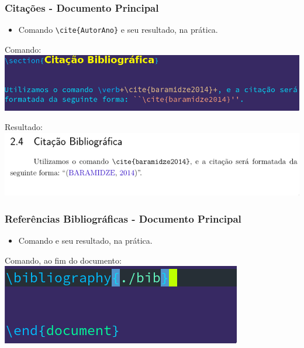 \documentclass{beamer}
\begin{document}
\begin{frame}[fragile]

  \frametitle{Citações - Documento Principal}

  \begin{itemize}
  \item Comando \verb_\cite{AutorAno}_ e seu resultado, na prática.
\end{itemize}

\vspace{0.2cm}

\begin{center}
  Comando: \\
  \includegraphics[scale=0.30]{../Imagens/A2I111.png}

  \vspace{0.2cm}

  Resultado: \\
  \includegraphics[scale=0.40]{../Imagens/A2I112.png}
\end{center}

\end{frame}

\begin{frame}[fragile]

  \frametitle{Referências Bibliográficas - Documento Principal}

  \begin{itemize}
  \item Comando \verb__ e seu resultado, na prática.
  \end{itemize}

  \vspace{0.2cm}

\begin{center}
  Comando, ao fim do documento: \\
  \vspace{0.2cm}
  \includegraphics[scale=0.60]{../Imagens/A2I122.png}

\end{center}

\end{frame}
\end{document}
